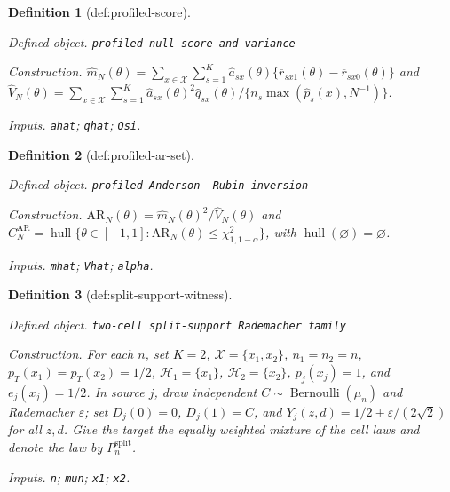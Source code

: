 \documentclass{article}
\newtheorem{definition}{Definition}
\begin{document}
\begin{definition}[def:profiled-score]\label{def:profiled-score}
\par\smallskip\noindent\emph{Defined object.} \texttt{profiled null score and variance}
\par\smallskip\noindent\emph{Construction.} \(\widehat m_N(\theta)=\sum_{x\in\mathcal X}\sum_{s=1}^K\widehat a_{sx}(\theta)\{\overline r_{sx1}(\theta)-\overline r_{sx0}(\theta)\}\) and \(\widehat V_N(\theta)=\sum_{x\in\mathcal X}\sum_{s=1}^K\widehat a_{sx}(\theta)^2\widehat q_{sx}(\theta)/\{n_s\max(\widehat p_s(x),N^{-1})\}\).
\par\smallskip\noindent\emph{Inputs.} \texttt{ahat}; \texttt{qhat}; \texttt{Osi}.
\end{definition}

\begin{definition}[def:profiled-ar-set]\label{def:profiled-ar-set}
\par\smallskip\noindent\emph{Defined object.} \texttt{profiled Anderson-\allowbreak{}-\allowbreak{}Rubin inversion}
\par\smallskip\noindent\emph{Construction.} \(\mathrm{AR}_N(\theta)=\widehat m_N(\theta)^2/\widehat V_N(\theta)\) and \(C_N^{\mathrm{AR}}=\operatorname{hull}\{\theta\in[-1,1]:\mathrm{AR}_N(\theta)\le\chi^2_{1,1-\alpha}\}\), with \(\operatorname{hull}(\varnothing)=\varnothing\).
\par\smallskip\noindent\emph{Inputs.} \texttt{mhat}; \texttt{Vhat}; \texttt{alpha}.
\end{definition}

\begin{definition}[def:split-support-witness]\label{def:split-support-witness}
\par\smallskip\noindent\emph{Defined object.} \texttt{two-\allowbreak{}cell split-\allowbreak{}support Rademacher family}
\par\smallskip\noindent\emph{Construction.} For each \(n\), set \(K=2\), \(\mathcal X=\{x_1,x_2\}\), \(n_1=n_2=n\), \(p_T(x_1)=p_T(x_2)=1/2\), \(\mathcal H_1=\{x_1\}\), \(\mathcal H_2=\{x_2\}\), \(p_j(x_j)=1\), and \(e_j(x_j)=1/2\). In source \(j\), draw independent \(C\sim\operatorname{Bernoulli}(\mu_n)\) and Rademacher \(\varepsilon\); set \(D_j(0)=0\), \(D_j(1)=C\), and \(Y_j(z,d)=1/2+\varepsilon/(2\sqrt2)\) for all \(z,d\). Give the target the equally weighted mixture of the cell laws and denote the law by \(P_n^{\mathrm{split}}\).
\par\smallskip\noindent\emph{Inputs.} \texttt{n}; \texttt{mun}; \texttt{x1}; \texttt{x2}.
\end{definition}
\end{document}
